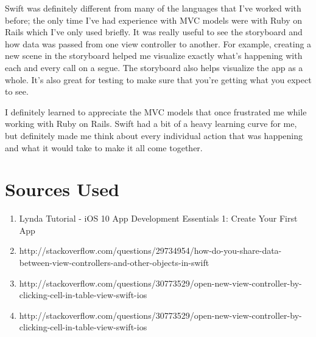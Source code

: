\documentclass[12pt]{article}
\begin{document}
\noindent Swift was definitely different from many of the languages that I've worked with before; the only time I've had experience with MVC models were with Ruby on Rails which I've only used briefly. It was really useful to see the storyboard and how data was passed from one view controller to another. For example, creating a new scene in the storyboard helped me visualize exactly what's happening with each and every call on a segue. The storyboard also helps visualize the app as a whole. It's also great for testing to make sure that you're getting what you expect to see.
\break

\noindent I definitely learned to appreciate the MVC models that once frustrated me while working with Ruby on Rails. Swift had a bit of a heavy learning curve for me, but definitely made me think about every individual action that was happening and what it would take to make it all come together. 


\section{Sources Used}
\begin{enumerate}
\item Lynda Tutorial - iOS 10 App Development Essentials 1: Create Your First App
\item http://stackoverflow.com/questions/29734954/how-do-you-share-data-between-view-controllers-and-other-objects-in-swift
\item http://stackoverflow.com/questions/30773529/open-new-view-controller-by-clicking-cell-in-table-view-swift-ios
\item http://stackoverflow.com/questions/30773529/open-new-view-controller-by-clicking-cell-in-table-view-swift-ios
\end{enumerate}
\end{document}
